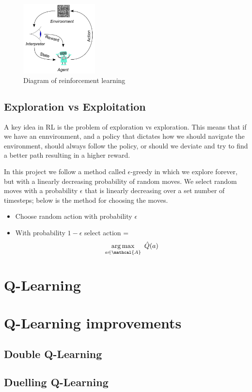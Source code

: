 \begin{figure}[htbp]
	\centering
	\includegraphics[width=0.35\textwidth]{chapters/chapter3/images/rl.jpg}
	\caption{Diagram of reinforcement learning
		\label{fig:rl-diagram}
	}
\end{figure}


\subsection{Exploration vs Exploitation}
\label{dsgn:sec:rl:expt-v-explor}
A key idea in RL is the problem of exploration vs exploration. This means that if we have an ennvironment, and a policy that dictates how we should navigate the environment, should always follow the policy, or should we deviate and try to find a better path resulting in a higher reward.

In this project we follow a method called $\epsilon$-greedy in which we explore forever, but with a linearly decreasing probability of random moves. We select random moves with a probability $\epsilon$ that is linearly decreasing over a set number of timesteps; below is the method for choosing the moves.

\begin{center}
	\begin{itemize}
		\item Choose random action with probability $\epsilon$
		\item With probability $1 - \epsilon$ select \vspace*{-9.25mm} action = $$\argmax_{a \in \mathcal{A}}~\hat{Q}(a)$$
	\end{itemize}
\end{center}

\section{Q-Learning}
\label{dsgn:sec:qlearning}

\section{Q-Learning improvements}
\label{dsgn:sec:qlearning:qextra}

\subsection{Double Q-Learning}
\label{dsgn:sec:qlearning:doubledqn}

\subsection{Duelling Q-Learning}
\label{dsgn:sec:qlearning:dueldqn}

